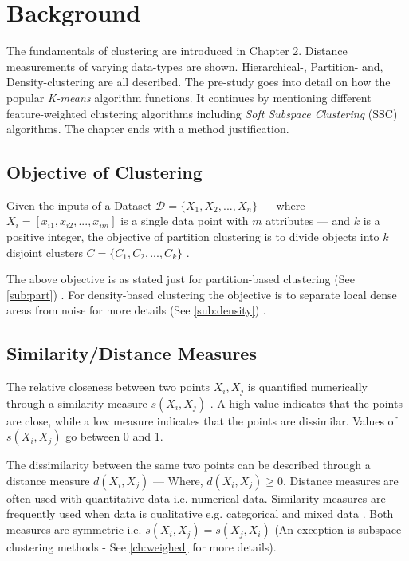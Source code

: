 \documentclass[../report.tex]{subfiles}
\begin{document}
\chapter{Background}
The fundamentals of clustering are introduced in Chapter 2. Distance measurements of varying data-types are shown. Hierarchical-, Partition- and, Density-clustering are all described. The pre-study goes into detail on how the popular \textit{K-means} algorithm functions. It continues by mentioning different feature-weighted clustering algorithms including \textit{Soft Subspace Clustering} (SSC) algorithms. The chapter ends with a method justification.

\section{Objective of Clustering}
Given the inputs of a Dataset $\mathcal{D} = \{X_{ 1 }, X_{ 2 },..., X_{ n } \}$ --- where $X_i = [x_{i1}, x_{i2},...,x_{im} ]$ is a single data point with $m$ attributes --- and $k$ is a positive integer, the objective of partition clustering is to divide objects into $k$ disjoint clusters ${C} = \{C_1, C_2,..., C_k \}$ \cite{Huang97clusteringlarge}.

The above objective is as stated just for partition-based clustering (See \ref{sub:part})
. For density-based clustering the objective is to separate local dense areas from noise for more details (See \ref{sub:density}) \cite{Ester1996}.

\section{Similarity/Distance Measures}
\label{ch:sim}
The relative closeness between two points $X_i, X_j$ is quantified numerically through a similarity measure $s(X_i, X_j)$ \cite{diday1976clustering}. A high value indicates that the points are close, while a low measure indicates that the points are dissimilar. Values of $s(X_i, X_j)$ go between 0 and 1.

The dissimilarity between the same two points can be described through a distance measure $d(X_i, X_j)$ --- Where, $d(X_i, X_j) \geq 0$. Distance measures are often used with quantitative data i.e. numerical data. Similarity measures are frequently used when data is qualitative e.g. categorical and mixed data \cite{Wunsch2005}. Both measures are symmetric i.e. $s(X_i, X_j) = s(X_j, X_i)$ (An exception is subspace clustering methods - See \ref{ch:weighed} for more details).
\end{document}
